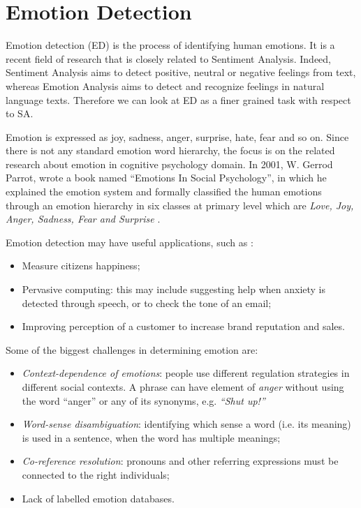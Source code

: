 \section{Emotion Detection}

Emotion detection (ED) is the process of identifying human emotions. It is a recent field of research that is closely related to Sentiment Analysis. Indeed, Sentiment Analysis aims to detect positive, neutral or negative feelings from text, whereas Emotion Analysis aims to detect and recognize feelings in natural language texts. Therefore we can look at ED as a finer grained task with respect to SA.\par
Emotion is expressed as joy, sadness, anger, surprise, hate, fear and so on. Since there is not any standard emotion word hierarchy, the focus is on the related research about emotion in cognitive psychology domain. In 2001, W. Gerrod Parrot, wrote a book named ``Emotions In Social Psychology''\cite{Parrott2016}, in which he explained the emotion system and formally classified the human emotions through an emotion hierarchy in six classes at primary level which are \textit{Love, Joy, Anger, Sadness, Fear and Surprise} \cite{edfromtext}.\par

Emotion detection may have useful applications, such as \cite{microsoft}: 
\begin{itemize}
\item Measure citizens happiness;
\item Pervasive computing: this may include suggesting help when anxiety is detected through speech, or to check the tone of an email; 
\item Improving perception of a customer to increase brand reputation and sales. 
\end{itemize}

Some of the biggest challenges in determining emotion are:
\begin{itemize}
\item \textit{Context-dependence of emotions}: people use different regulation strategies in different social contexts. A phrase can have element of \textit{anger} without using the word ``anger'' or any of its synonyms, e.g. \textit{``Shut up!''}
\item \textit{Word-sense disambiguation}: identifying which sense a word (i.e. its meaning) is used in a sentence, when the word has multiple meanings; 
\item \textit{Co-reference resolution}: pronouns and other referring expressions must be connected to the right individuals;
\item Lack of labelled emotion databases. 
\end{itemize}


